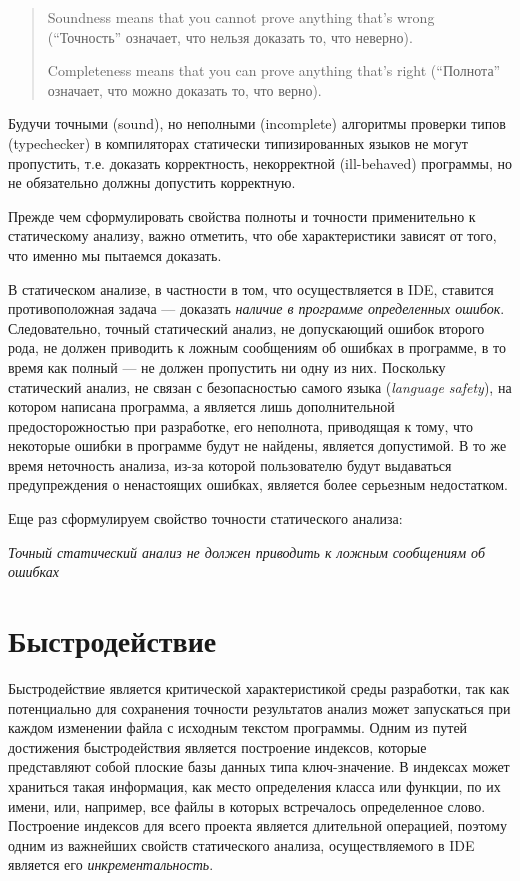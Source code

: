 \begin{quote}
Soundness means that you cannot prove anything that's wrong (``Точность'' означает,
что нельзя доказать то, что неверно).

Completeness means that you can prove anything that's right (``Полнота'' означает,
что можно доказать то, что верно).
\end{quote}

Будучи точными (sound), но неполными (incomplete) алгоритмы проверки типов
(typechecker) в компиляторах статически типизированных языков не могут
пропустить, т.е. доказать корректность, некорректной (ill-behaved) программы, но
не обязательно должны допустить корректную.

Прежде чем сформулировать свойства полноты и точности применительно к
статическому анализу, важно отметить, что обе характеристики зависят от того,
что именно мы пытаемся доказать.

В статическом анализе, в частности в том, что осуществляется в IDE, ставится
противоположная задача --- доказать \emph{наличие в программе определенных
  ошибок}.  Следовательно, точный статический анализ, не допускающий ошибок
второго рода, не должен приводить к ложным сообщениям об ошибках в программе, в
то время как полный --- не должен пропустить ни одну из них. Поскольку
статический анализ, не связан с безопасностью самого языка (\emph{language
  safety}), на котором написана программа, а является лишь дополнительной
предосторожностью при разработке, его неполнота, приводящая к тому, что
некоторые ошибки в программе будут не найдены, является допустимой. В то же
время неточность анализа, из-за которой пользователю будут выдаваться
предупреждения о ненастоящих ошибках, является более серьезным недостатком.

Еще раз сформулируем свойство точности статического анализа:

\emph{Точный статический анализ не должен приводить к ложным сообщениям об 
ошибках}

\section{Быстродействие}

Быстродействие является критической характеристикой среды разработки, так как
потенциально для сохранения точности результатов анализ может запускаться при
каждом изменении файла с исходным текстом программы. Одним из путей достижения
быстродействия является построение индексов, которые представляют собой плоские
базы данных типа ключ-значение. В индексах может храниться такая информация, как
место определения класса или функции, по их имени, или, например, все файлы в
которых встречалось определенное слово. Построение индексов для всего проекта
является длительной операцией, поэтому одним из важнейших свойств статического
анализа, осуществляемого в IDE является его \emph{инкрементальность}.

